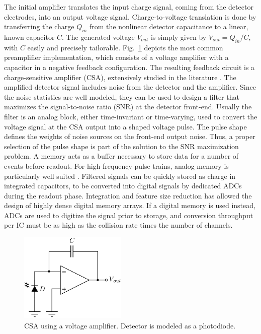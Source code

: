 The initial amplifier translates the input charge signal, coming from the detector electrodes, into an output voltage signal. Charge-to-voltage translation is done by transferring the charge $Q_{in}$ from the nonlinear detector capacitance to a linear, known capacitor $C$. The generated voltage $V_{out}$ is simply given by $V_{out} = Q_{in}/C$, with $C$ easily and precisely tailorable. Fig.~\ref{fig:csa_post} depicts the most common preamplifier implementation, which consists of a voltage amplifier with a capacitor in a negative feedback configuration. The resulting feedback circuit is a charge-sensitive amplifier (CSA), extensively studied in the literature \citep{Snoeys100,Asp100,deGeronimo500,oconnor100,Alvarez101}. The amplified detector signal includes noise from the detector and the amplifier. Since the noise statistics are well modeled, they can be used to design a filter that maximizes the signal-to-noise ratio (SNR) at the detector front-end. Usually the filter is an analog block, either time-invariant or time-varying, used to convert the voltage signal at the CSA output into a shaped voltage pulse. The pulse shape defines the weights of noise sources on the front-end output noise. Thus, a proper selection of the pulse shape is part of the solution to the SNR maximization problem. A memory acts as a buffer necessary to store data for a number of events before readout. For high-frequency pulse trains, analog memory is particularly well suited \citep{Kleinfelder100,Haller100}. Filtered signals can be quickly stored as charge in integrated capacitors, to be converted into digital signals by dedicated ADCs during the readout phase. Integration and feature size reduction has allowed the design of highly dense digital memory arrays. If a digital memory is used instead, ADCs are used to digitize the signal prior to storage, and conversion throughput per IC must be as high as the collision rate times the number of channels. 

\begin{figure}[!t]
	\centering
	\includegraphics[width=2in]{./Figures/csa_post}
	\caption{CSA using a voltage amplifier. Detector is modeled as a photodiode.}\label{fig:csa_post}
\end{figure}


